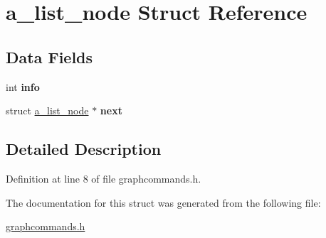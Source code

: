 \hypertarget{structa__list__node}{}\section{a\+\_\+list\+\_\+node Struct Reference}
\label{structa__list__node}
\subsection*{Data Fields}
\begin{DoxyCompactItemize}
\item 
\mbox{\label{structa__list__node_a29045c997670516117cd2d1cac1069ed}} 
int {\bfseries info}
\item 
\mbox{\label{structa__list__node_ac874548b41e8af6a71df1b2c750cf53c}} 
struct \hyperlink{structa__list__node}{a\+\_\+list\+\_\+node} $\ast$ {\bfseries next}
\end{DoxyCompactItemize}


\subsection{Detailed Description}


Definition at line 8 of file graphcommands.\+h.



The documentation for this struct was generated from the following file\+:\begin{DoxyCompactItemize}
\item 
\hyperlink{graphcommands_8h}{graphcommands.\+h}\end{DoxyCompactItemize}
